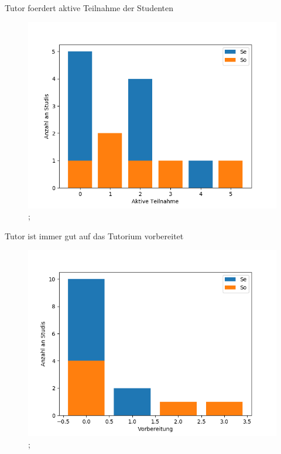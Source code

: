 \documentclass[10pt]{beamer}
\begin{document}
\begin{frame}[fragile]{Tutor foerdert aktive Teilnahme der Studenten} 
 \begin{figure}
 \includegraphics[width= 0.9\linewidth]{./PDFcreater/Plots/Nx/Tutor+foerdert+aktive+Teilnahme+der+Studenten.png};
 \end{figure}
 \end{frame}
\begin{frame}[fragile]{Tutor ist immer gut auf das Tutorium vorbereitet} 
 \begin{figure}
 \includegraphics[width= 0.9\linewidth]{./PDFcreater/Plots/Nx/Tutor+ist+immer+gut+auf+das+Tutorium+vorbereitet.png};
 \end{figure}
 \end{frame}
\end{document}
